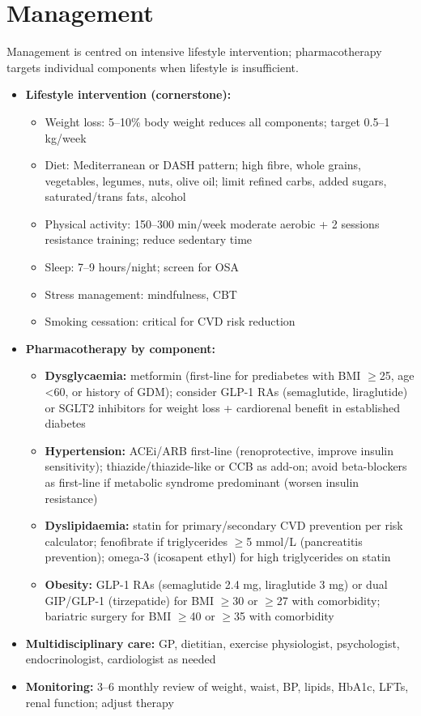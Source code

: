 \section*{Management}
Management is centred on intensive lifestyle intervention; pharmacotherapy targets individual components when lifestyle is insufficient.
\begin{itemize}
    \item \textbf{Lifestyle intervention (cornerstone):}
    \begin{itemize}
        \item Weight loss: 5--10\% body weight reduces all components; target 0.5--1 kg/week
        \item Diet: Mediterranean or DASH pattern; high fibre, whole grains, vegetables, legumes, nuts, olive oil; limit refined carbs, added sugars, saturated/trans fats, alcohol
        \item Physical activity: 150--300 min/week moderate aerobic + 2 sessions resistance training; reduce sedentary time
        \item Sleep: 7--9 hours/night; screen for OSA
        \item Stress management: mindfulness, CBT
        \item Smoking cessation: critical for CVD risk reduction
    \end{itemize}
    \item \textbf{Pharmacotherapy by component:}
    \begin{itemize}
        \item \textbf{Dysglycaemia:} metformin (first-line for prediabetes with BMI $\ge$25, age <60, or history of GDM); consider GLP-1 RAs (semaglutide, liraglutide) or SGLT2 inhibitors for weight loss + cardiorenal benefit in established diabetes
        \item \textbf{Hypertension:} ACEi/ARB first-line (renoprotective, improve insulin sensitivity); thiazide/thiazide-like or CCB as add-on; avoid beta-blockers as first-line if metabolic syndrome predominant (worsen insulin resistance)
        \item \textbf{Dyslipidaemia:} statin for primary/secondary CVD prevention per risk calculator; fenofibrate if triglycerides $\ge$5 mmol/L (pancreatitis prevention); omega-3 (icosapent ethyl) for high triglycerides on statin
        \item \textbf{Obesity:} GLP-1 RAs (semaglutide 2.4 mg, liraglutide 3 mg) or dual GIP/GLP-1 (tirzepatide) for BMI $\ge$30 or $\ge$27 with comorbidity; bariatric surgery for BMI $\ge$40 or $\ge$35 with comorbidity
    \end{itemize}
    \item \textbf{Multidisciplinary care:} GP, dietitian, exercise physiologist, psychologist, endocrinologist, cardiologist as needed
    \item \textbf{Monitoring:} 3--6 monthly review of weight, waist, BP, lipids, HbA1c, LFTs, renal function; adjust therapy
\end{itemize}


